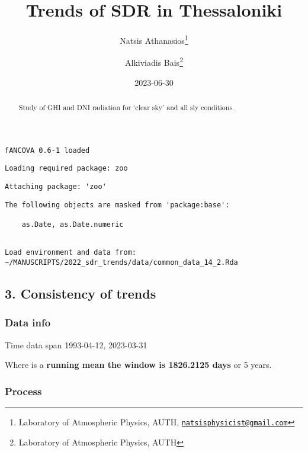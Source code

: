 \documentclass[
  10pt,
  a4paper,oneside]{article}
\title{Trends of SDR in Thessaloniki}
\author{Natsis Athanasios\footnote{Laboratory of Atmospheric Physics, AUTH, \href{mailto:natsisphysicist@gmail.com}{\nolinkurl{natsisphysicist@gmail.com}}} \and Alkiviadis Bais\footnote{Laboratory of Atmospheric Physics, AUTH}}
\date{2023-06-30}
\begin{document}
\maketitle
\begin{abstract}
Study of GHI and DNI radiation for `clear sky' and all sly conditions.
\end{abstract}

{
\hypersetup{linkcolor=}
\setcounter{tocdepth}{4}
\tableofcontents
}
\begin{verbatim}
fANCOVA 0.6-1 loaded
\end{verbatim}

\begin{verbatim}
Loading required package: zoo
\end{verbatim}

\begin{verbatim}
Attaching package: 'zoo'
\end{verbatim}

\begin{verbatim}
The following objects are masked from 'package:base':

    as.Date, as.Date.numeric
\end{verbatim}

\begin{verbatim}

Load environment and data from:  ~/MANUSCRIPTS/2022_sdr_trends/data/common_data_14_2.Rda 
\end{verbatim}

\hypertarget{consistency-of-trends}{%
\subsection{3. Consistency of trends}\label{consistency-of-trends}}

\hypertarget{data-info}{%
\subsubsection{Data info}\label{data-info}}

Time data span 1993-04-12, 2023-03-31

Where is a \textbf{running mean the window is 1826.2125 days} or
5 years.

\hypertarget{process}{%
\subsubsection{Process}\label{process}}

\newpage
\FloatBarrier
\end{document}
